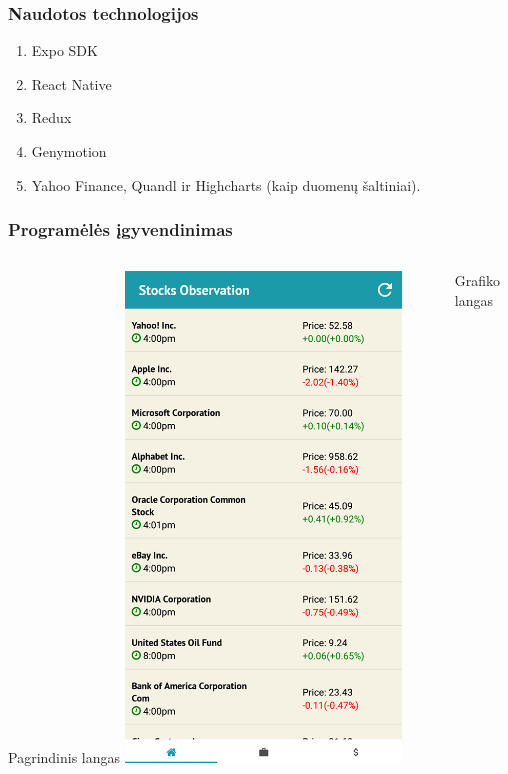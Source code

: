 \documentclass[hyperref={breaklinks=true},fleqn,mathserif]{beamer}
\begin{document}
	\begin{frame}
		\frametitle{Naudotos technologijos}
		\begin{enumerate}
			\item Expo SDK
			\item React Native
			\item Redux
			\item Genymotion
			\item Yahoo Finance, Quandl ir Highcharts (kaip duomenų šaltiniai).
		\end{enumerate}
	\end{frame}
	\begin{frame}
		\frametitle{Programėlės įgyvendinimas}
		\begin{columns}
			\begin{column}{.48\textwidth}
				\begin{block}{Pagrindinis langas}
					\includegraphics[width=0.65\textwidth]{Pav/home.png}\centering
				\end{block}
			\end{column}
			\begin{column}{.48\textwidth}
				\begin{block}{Grafiko langas}

\end{block}
\end{column}
\end{columns}
\end{frame}
\end{document}
